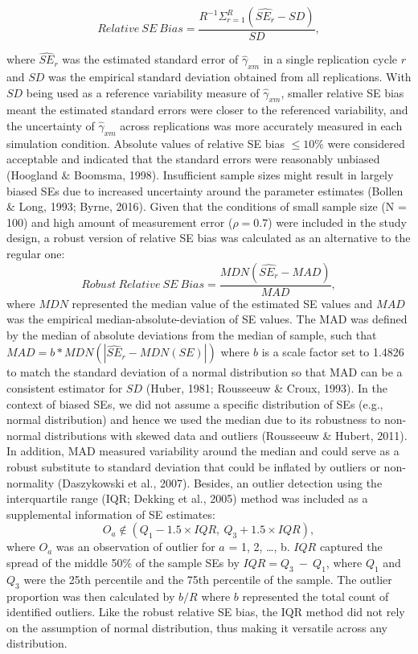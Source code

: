 \documentclass[
  man]{apa6}
\begin{document}
\begin{equation}
Relative\ SE\ Bias = \frac{R^{-1}\Sigma^{R}_{r = 1}(\widehat{SE_{r}} - SD)}{SD},
\end{equation}

where \(\widehat{SE}_{r}\) was the estimated standard error of \(\hat{\gamma}_{xm}\) in a single replication cycle \(r\) and \(SD\) was the empirical standard deviation obtained from all replications. With \(SD\) being used as a reference variability measure of \(\hat{\gamma}_{xm}\), smaller relative SE bias meant the estimated standard errors were closer to the referenced variability, and the uncertainty of \(\hat{\gamma}_{xm}\) across replications was more accurately measured in each simulation condition. Absolute values of relative SE bias \(\le 10\%\) were considered acceptable and indicated that the standard errors were reasonably unbiased (Hoogland \(\&\) Boomsma, 1998). Insufficient sample sizes might result in largely biased SEs due to increased uncertainty around the parameter estimates (Bollen \& Long, 1993; Byrne, 2016). Given that the conditions of small sample size (N = 100) and high amount of measurement error (\(\rho = 0.7\)) were included in the study design, a robust version of relative SE bias was calculated as an alternative to the regular one:
\begin{equation}
Robust\ Relative\ SE\ Bias = \frac{MDN(\widehat{SE_{r}} - MAD)}{MAD},
\end{equation}
where \(MDN\) represented the median value of the estimated SE values and \(MAD\) was the empirical median-absolute-deviation of SE values. The MAD was defined by the median of absolute deviations from the median of sample, such that \(MAD = b*MDN(|\widehat{SE}_{r} - MDN(SE)|)\) where \(b\) is a scale factor set to 1.4826 to match the standard deviation of a normal distribution so that MAD can be a consistent estimator for \(SD\) (Huber, 1981; Rousseeuw \& Croux, 1993). In the context of biased SEs, we did not assume a specific distribution of SEs (e.g., normal distribution) and hence we used the median due to its robustness to non-normal distributions with skewed data and outliers (Rousseeuw \& Hubert, 2011). In addition, MAD measured variability around the median and could serve as a robust substitute to standard deviation that could be inflated by outliers or non-normality (Daszykowski et al., 2007).
Besides, an outlier detection using the interquartile range (IQR; Dekking et al., 2005) method was included as a supplemental information of SE estimates:
\begin{equation}
O_{a} \not\in (Q_{1} - 1.5 \times IQR, \ Q_{3} + 1.5 \times IQR),
\end{equation}
where \(O_{a}\) was an observation of outlier for \(a\) = 1, 2, \ldots, b. \(IQR\) captured the spread of the middle 50\(\%\) of the sample SEs by \(IQR = Q_{3} \ - \ Q_{1}\), where \(Q_{1}\) and \(Q_{3}\) were the 25th percentile and the 75th percentile of the sample. The outlier proportion was then calculated by \(b/R\) where \(b\) represented the total count of identified outliers. Like the robust relative SE bias, the IQR method did not rely on the assumption of normal distribution, thus making it versatile across any distribution.
\end{document}
